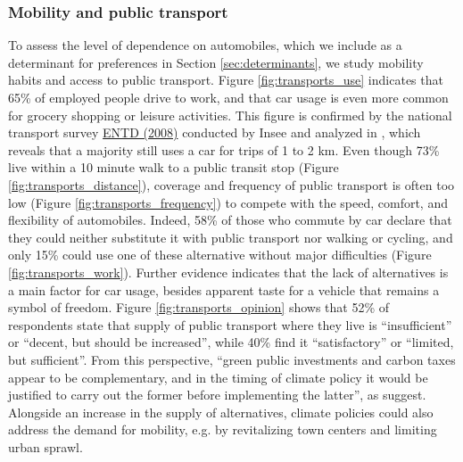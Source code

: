 \documentclass[english,5p,authoryear]{elsarticle}
\begin{document}
    \subsubsection{Mobility and public transport}

To assess the level of dependence on automobiles, which we include as a determinant for preferences in Section \ref{sec:determinants}, we study mobility habits and access to public transport. Figure \ref{fig:transports_use} indicates that 65\% of employed people drive to work, and that car usage is even more common for grocery shopping or leisure activities. This figure is confirmed by the national transport survey \href{http://www.progedo-adisp.fr/enquetes/XML/lil-0634.xml}{ENTD (2008)} conducted by Insee and analyzed in \cite{pappalardo_mobilite_2010}, which reveals that a majority still uses a car for trips of 1 to 2 km. Even though 73\% live within a 10 minute walk to a public transit stop (Figure \ref{fig:transports_distance}), coverage and frequency of public transport is often too low (Figure \ref{fig:transports_frequency}) to compete with the speed, comfort, and flexibility of automobiles. Indeed, 58\% of those who commute by car declare that they could neither substitute it with public transport nor walking or cycling, and only 15\% could use one of these alternative without major difficulties (Figure \ref{fig:transports_work}). Further evidence indicates that the lack of alternatives is a main factor for car usage, besides apparent taste for a vehicle that remains a symbol of freedom. Figure \ref{fig:transports_opinion} shows that 52\% of respondents state that supply of public transport where they live is ``insufficient'' or ``decent, but should be increased'', while 40\% find it ``satisfactory'' or ``limited, but sufficient''. From this perspective, ``green public investments and carbon taxes appear to be complementary, and in the timing of climate policy it would be justified to carry out the former before implementing the latter'', as \cite{bureau_pour_2019} suggest. Alongside an increase in the supply of alternatives, climate policies could also address the demand for mobility, e.g. by revitalizing town centers and limiting urban sprawl.

\end{document}
